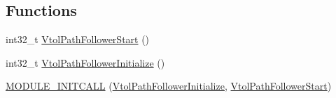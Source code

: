 \subsection*{\-Functions}
\begin{DoxyCompactItemize}
\item 
int32\-\_\-t \hyperlink{group___vtol_path_follower_ga961a79aed22b448a7401bcca54fbeed4}{\-Vtol\-Path\-Follower\-Start} ()
\item 
int32\-\_\-t \hyperlink{group___vtol_path_follower_gaec33cc9b4cda3af1231529c8ef0dc9d1}{\-Vtol\-Path\-Follower\-Initialize} ()
\item 
\hyperlink{group___vtol_path_follower_ga304541063acff929281e0000e4a966da}{\-M\-O\-D\-U\-L\-E\-\_\-\-I\-N\-I\-T\-C\-A\-L\-L} (\hyperlink{group___vtol_path_follower_gaec33cc9b4cda3af1231529c8ef0dc9d1}{\-Vtol\-Path\-Follower\-Initialize}, \hyperlink{group___vtol_path_follower_ga961a79aed22b448a7401bcca54fbeed4}{\-Vtol\-Path\-Follower\-Start})
\end{DoxyCompactItemize}


